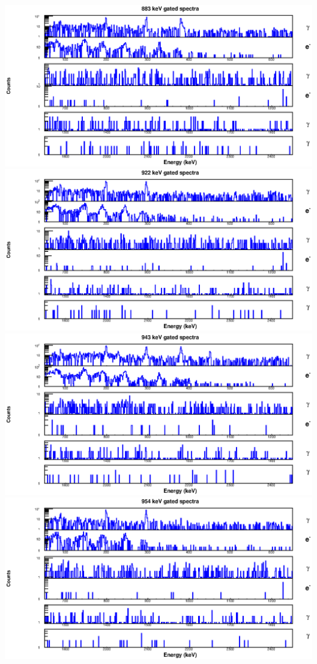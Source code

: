\begin{landscape}
\includegraphics[scale=1.2]{156Gd_Appendix/883_combined.eps}
\includegraphics[scale=1.2]{156Gd_Appendix/922_combined.eps}
\includegraphics[scale=1.2]{156Gd_Appendix/943_combined.eps}
\includegraphics[scale=1.2]{156Gd_Appendix/954_combined.eps}

\end{landscape}
